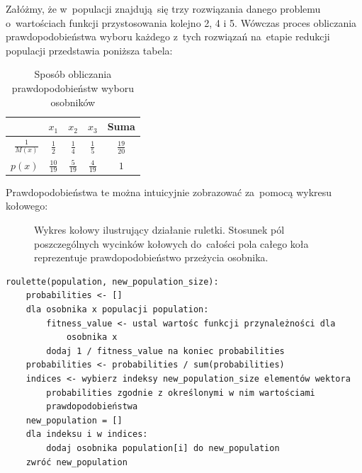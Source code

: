 \documentclass[12pt,a4paper]{article}
\theoremstyle{definition}
\begin{document}
\begin{tcolorbox}[title=Przykład --- metoda koła ruletki]
Załóżmy, że w~populacji znajdują~się trzy rozwiązania danego problemu o~wartościach funkcji przystosowania kolejno
2, 4 i 5.
Wówczas proces obliczania prawdopodobieństwa wyboru każdego z~tych rozwiązań na~etapie redukcji populacji przedstawia poniższa tabela:
\begin{table}[H]
\centering
\def\arraystretch{1.5}
\begin{tabular}{r|ccc|c}
{} & $x_1$ & $x_2$ & $x_3$ & Suma \\
\hline
$\frac{1}{M(x)}$ & $\frac{1}{2}$ & $\frac{1}{4}$ & $\frac{1}{5}$ & $\frac{19}{20}$ \\
$p(x)$ & $\frac{10}{19}$ & $\frac{5}{19}$ & $\frac{4}{19}$ & $1$
\end{tabular}
\caption{Sposób obliczania prawdopodobieństw wyboru osobników}
\end{table}
Prawdopodobieństwa te można intuicyjnie zobrazować za~pomocą wykresu kołowego:
\begin{figure}[H]
\centering
\newcommand{\slice}[4]{
  \pgfmathparse{0.5*#1+0.5*#2}
  \let\midangle\pgfmathresult

  \draw[thick,fill=black!10] (0,0) -- (#1:1) arc (#1:#2:1) -- cycle;

  \node[label=\midangle:#4] at (\midangle:1) {};

  \pgfmathparse{min((#2-#1-10)/110*(-0.3),0)}
  \let\temp\pgfmathresult
  \pgfmathparse{max(\temp,-0.5) + 0.8}
  \let\innerpos\pgfmathresult
  \node at (\midangle:\innerpos) {#3};
}

\caption{Wykres kołowy ilustrujący działanie ruletki.
Stosunek pól poszczególnych wycinków kołowych do~całości pola całego koła reprezentuje prawdopodobieństwo przeżycia osobnika.}
\end{figure}
\end{tcolorbox}

\begin{tcolorbox}[title=Metoda koła ruletki -- pseudokod]
\begin{verbatim}
roulette(population, new_population_size):
    probabilities <- []
    dla osobnika x populacji population:
        fitness_value <- ustal wartośc funkcji przynależności dla 
            osobnika x
        dodaj 1 / fitness_value na koniec probabilities
    probabilities <- probabilities / sum(probabilities)
    indices <- wybierz indeksy new_population_size elementów wektora 
        probabilities zgodnie z określonymi w nim wartościami
        prawdopodobieństwa
    new_population = []
    dla indeksu i w indices:
        dodaj osobnika population[i] do new_population
    zwróć new_population
\end{verbatim}
\end{tcolorbox}
\end{document}
